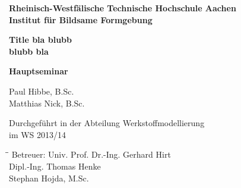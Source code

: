 %


\thispagestyle{empty} %

\begin{titlepage}     %

	\sffamily
	\begin{center}
		\vspace{1cm}
		
		\large{\textbf{Rheinisch-Westfälische Technische Hochschule Aachen\\Institut für Bildsame Formgebung}}
		
		\vspace{20mm}
				
		\Large{\textbf{Title bla blubb \\}}
		\Large{\textbf{blubb bla}}
		
		\vspace{2cm}
		

		
		\LARGE{\textbf{Hauptseminar}} \\
		
		\vspace{1.5cm}
		
		\large{Paul Hibbe, B.Sc. \\ Matthias Nick, B.Sc.}\\
		
		\vspace{3cm}
		\end{center}
		

	
\begin{center}
\large{Durchgeführt in der Abteilung Werkstoffmodellierung \\ im WS 2013/14}
\end{center}

\vspace{3cm}
\begin{tabbing}
\hspace*{3cm}\=\hspace{2cm}\=\kill
Betreuer: \>Univ. Prof. Dr.-Ing. Gerhard Hirt\\
          \>Dipl.-Ing. Thomas Henke\\
          \>Stephan Hojda, M.Sc.
\end{tabbing}
\end{titlepage} %
